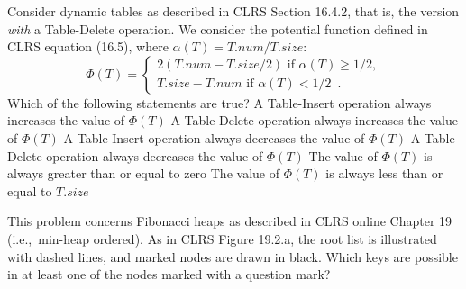 Consider dynamic tables as described in CLRS Section 16.4.2, that is, the version \emph{with} a {\sc Table-Delete} operation.
We consider the potential function defined in CLRS equation (16.5), where $\alpha(T) = T.num / T.size$:
\[
\Phi(T) =
\begin{cases}
    2(T.num - T.size/2) \text{ if } \alpha(T) \geq 1/2,\\
    T.size - T.num \text{ if } \alpha(T) < 1/2 \enspace .
\end{cases}
\]
Which of the following statements are true?
\multipleanswers
\optionsstart
\answer A {\sc Table-Insert} operation always increases the value of $\Phi(T)$
\answer A {\sc Table-Delete} operation always increases the value of $\Phi(T)$
\answer A {\sc Table-Insert} operation always decreases the value of $\Phi(T)$
\answer A {\sc Table-Delete} operation always decreases the value of $\Phi(T)$
\answer The value of $\Phi(T)$ is always greater than or equal to zero \correct
\answer The value of $\Phi(T)$ is always less than or equal to $T.size$ \correct
\optionsend




\label{spm:fibonacci}
This problem concerns Fibonacci heaps as described in CLRS online Chapter 19 (i.e.,~min-heap ordered).
As in CLRS Figure 19.2.a, the root list is illustrated with dashed lines, and marked nodes are drawn in black.
Which keys are possible in at least one of the nodes marked with a question mark? \multipleanswers

\begin{center}
  \end{center}

